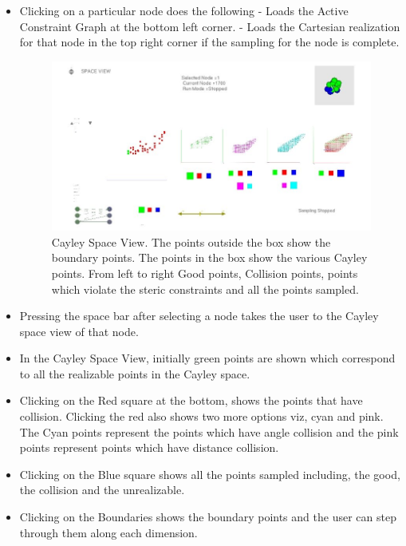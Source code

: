 \documentclass[10pt]{article}
\begin{document}
\begin{itemize}
\item Clicking on a particular node does the following - Loads the Active
		Constraint Graph at the bottom left corner.  - Loads the Cartesian
		realization for that node in the top right corner if the sampling for
		the node is complete.

\begin{figure}[h]
	\centering
	\includegraphics[scale=0.5] {fig/CayleySpaceView.jpg}
	\caption{Cayley Space View. The points outside the box show the boundary
points. The points in the box show the various Cayley points. From left to
right Good points, Collision points, points which violate the steric
constraints and all the points sampled.}
\label{Cayleyspaceview}
\end{figure}


\item Pressing the space bar after selecting a node takes the user to the
		Cayley space view of that node.

\item In the Cayley Space View, initially green points are shown which
		correspond to all the realizable points in the Cayley space.

\item Clicking on the Red square at the bottom, shows the points that have
		collision. Clicking the red also shows two more options viz, cyan and
		pink. The Cyan points represent the points which have angle collision
		and the pink points represent points which have distance collision.

\item Clicking on the Blue square shows all the points sampled including, the
		good, the collision and the unrealizable.

\item Clicking on the Boundaries shows the boundary points and the user can
		step through them along each dimension.


\end{itemize}
\end{document}
